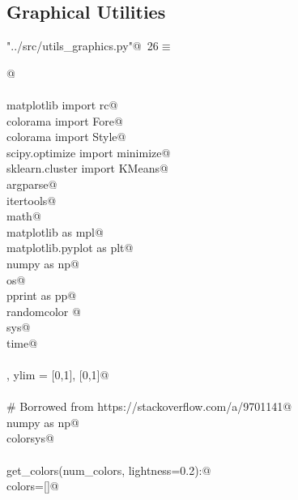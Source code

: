 \documentclass[10.0pt]{report}
\begin{document}
\begin{appendices}
\section{Graphical Utilities}


\begin{flushleft} \small\label{scrap11}\raggedright\small
{} \verb@"../src/utils_graphics.py"@\nobreak\ {\footnotesize {26}}$\equiv$
\vspace{-1ex}
\begin{list}{}{} \item
\mbox{}\verb@    @\\
\mbox{}\verb@@\\
\mbox{}\verb@from matplotlib import rc@\\
\mbox{}\verb@from colorama import Fore@\\
\mbox{}\verb@from colorama import Style@\\
\mbox{}\verb@from scipy.optimize import minimize@\\
\mbox{}\verb@from sklearn.cluster import KMeans@\\
\mbox{}\verb@import argparse@\\
\mbox{}\verb@import itertools@\\
\mbox{}\verb@import math@\\
\mbox{}\verb@import matplotlib as mpl@\\
\mbox{}\verb@import matplotlib.pyplot as plt@\\
\mbox{}\verb@import numpy as np@\\
\mbox{}\verb@import os@\\
\mbox{}\verb@import pprint as pp@\\
\mbox{}\verb@import randomcolor @\\
\mbox{}\verb@import sys@\\
\mbox{}\verb@import time@\\
\mbox{}\verb@@\\
\mbox{}\verb@xlim, ylim = [0,1], [0,1]@\\
\mbox{}\verb@@\\
\mbox{}\verb@# Borrowed from https://stackoverflow.com/a/9701141@\\
\mbox{}\verb@import numpy as np@\\
\mbox{}\verb@import colorsys@\\
\mbox{}\verb@@\\
\mbox{}\verb@def get_colors(num_colors, lightness=0.2):@\\
\mbox{}\verb@    colors=[]@\\

\end{list}
\end{flushleft}
\end{appendices}
\end{document}
